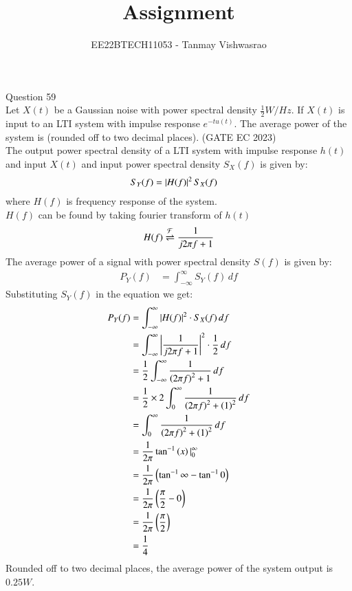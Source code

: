 \documentclass[article,12pt]{IEEEtran}
\renewcommand\thetable{\arabic{table}}
\begin{document}
\let\vec\mathbf





\vspace{3cm}

\title{
Assignment
}
\author{ EE22BTECH11053 - Tanmay Vishwasrao%
	
}	

\maketitle


\newpage


\bigskip
\renewcommand{\thefigure}{\theenumi}
\renewcommand{\thetable}{\theenumi}
Question 59\\
Let $X(t)$ be a Gaussian noise with power spectral density $\frac{1}{2} W/Hz$. If $X(t)$ is input to an LTI system with impulse response $e^{-tu(t)}$. The average power of the system is (rounded off to two decimal places).
\hfill(GATE EC 2023)\\
\solution
The output power spectral density of a LTI system with impulse response $h(t)$ and input $X(t)$ and input power spectral density $S_X(f)$ is given by:
\begin{align}
S_Y(f) &= \left\vert H(f)\right\vert^2S_X(f)
\end{align}
where $H(f)$ is frequency response of the system. \\
$H(f)$ can be found by taking fourier transform of $h(t)$
\begin{align}
H(f) \overset{\mathcal{F}}{ \rightleftharpoons} \frac{1}{j2\pi f +1}
\end{align}
The average power of a signal with power spectral density $S(f)$ is given by:
\begin{align}
P_Y(f) &= \int_{-\infty}^{\infty} S_Y(f) \, df
\end{align}
Substituting $S_Y(f)$ in the equation we get:
\begin{align}
P_Y(f) &= \int_{-\infty}^{\infty} \left\vert H(f)\right\vert^2 \cdot S_X(f) \, df \\
&= \int_{-\infty}^{\infty} \left\vert\frac{1}{j2\pi f +1}\right\vert^2\cdot \frac{1}{2} \, df\\
&= \frac{1}{2}\int_{-\infty}^{\infty} \frac{1}{\left(2\pi f\right)^2 +1} \, df\\
&= \frac{1}{2}\times 2\int_{0}^{\infty} \frac{1}{\left(2\pi f\right)^2 +\left(1\right)^2} \, df\\
&= \int_{0}^{\infty} \frac{1}{\left(2\pi f\right)^2 +\left(1\right)^2} \, df\\
&= \frac{1}{2\pi}\tan^{-1}\left(x\right) |_{0}^{\infty}\\
	&= \frac{1}{2\pi}\left(\tan^{-1}\infty-\tan^{-1}0\right)\\
	&= \frac{1}{2\pi}\left(\frac{\pi}{2}-0\right)\\
	&= \frac{1}{2\pi}\left(\frac{\pi}{2}\right) \\
&= \frac{1}{4}
\end{align}
Rounded off to two decimal places, the average power of the system output is $0.25 W$.
\end{document}
